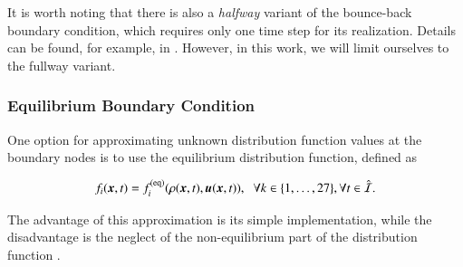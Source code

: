It is worth noting that there is also a \textit{halfway} variant of the bounce-back boundary condition, which requires only one time step for its realization. Details can be found, for example, in \cite{Kruger}. However, in this work, we will limit ourselves to the fullway variant.

\subsubsection{Equilibrium Boundary Condition}\label{equilibrium bc}
One option for approximating unknown distribution function values at the boundary nodes is to use the equilibrium distribution function, defined as \cite{PE}

\begin{equation}
	f_i(\vec{x}, t)=f_{i}^{\text{(eq)}}(\rho(\vec{x}, t), \vec{u}(\vec{x}, t)), \hspace{2mm}  \forall k \in \{1,\dots,27\}, \forall t \in \hat{\mathcal{I}}.
\end{equation}

The advantage of this approximation is its simple implementation, while the disadvantage is the neglect of the non-equilibrium part of the distribution function \cite{PE}.
